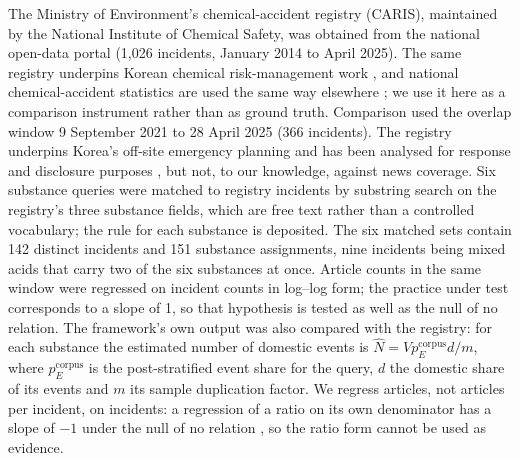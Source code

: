\documentclass[1p,times]{elsarticle}
\begin{document}
The Ministry of Environment's chemical-accident registry (CARIS), maintained by the National Institute of Chemical Safety, was obtained from the national open-data portal (1,026 incidents, January 2014 to April 2025). The same registry underpins Korean chemical risk-management work \cite{lyu2018damage}, and national chemical-accident statistics are used the same way elsewhere \cite{chen2020chemical}; we use it here as a comparison instrument rather than as ground truth. Comparison used the overlap window 9 September 2021 to 28 April 2025 (366 incidents). The registry underpins Korea's off-site emergency planning and has been analysed for response and disclosure purposes \cite{nam2025,yoon2025}, but not, to our knowledge, against news coverage. Six substance queries were matched to registry incidents by substring search on the registry's three substance fields, which are free text rather than a controlled vocabulary; the rule for each substance is deposited. The six matched sets contain 142 distinct incidents and 151 substance assignments, nine incidents being mixed acids that carry two of the six substances at once. Article counts in the same window were regressed on incident counts in log--log form; the practice under test corresponds to a slope of 1, so that hypothesis is tested as well as the null of no relation. The framework's own output was also compared with the registry: for each substance the estimated number of domestic events is $\hat N = V p_E^{\mathrm{corpus}} d / m$, where $p_E^{\mathrm{corpus}}$ is the post-stratified event share for the query, $d$ the domestic share of its events and $m$ its sample duplication factor. We regress articles, not articles per incident, on incidents: a regression of a ratio on its own denominator has a slope of $-1$ under the null of no relation \cite{pearson1897}, so the ratio form cannot be used as evidence.
\end{document}
